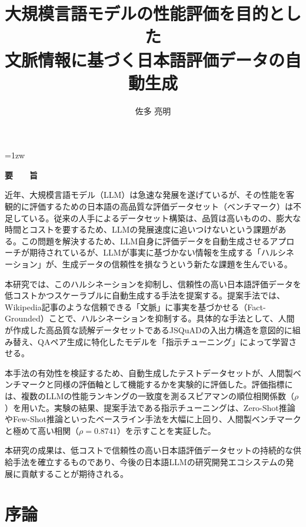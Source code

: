 \documentclass[a4paper,11pt]{jreport}
\title{大規模言語モデルの性能評価を目的とした\\
文脈情報に基づく日本語評価データの自動生成}
\author{佐多 亮明}
\begin{document}
\maketitle
\thispagestyle{empty}
\newpage

\thispagestyle{empty}
\vspace*{20pt plus 1fil}
\parindent=1zw
\noindent
\begin{center}
{\Large \bf 要　　旨}
\vspace{2cm}
\end{center}
近年、大規模言語モデル（LLM）は急速な発展を遂げているが、その性能を客観的に評価するための日本語の高品質な評価データセット（ベンチマーク）は不足している。従来の人手によるデータセット構築は、品質は高いものの、膨大な時間とコストを要するため、LLMの発展速度に追いつけないという課題がある。この問題を解決するため、LLM自身に評価データを自動生成させるアプローチが期待されているが、LLMが事実に基づかない情報を生成する「ハルシネーション」が、生成データの信頼性を損なうという新たな課題を生んでいる。

本研究では、このハルシネーションを抑制し、信頼性の高い日本語評価データを低コストかつスケーラブルに自動生成する手法を提案する。提案手法では、Wikipedia記事のような信頼できる「文脈」に事実を基づかせる（Fact-Grounded）ことで、ハルシネーションを抑制する。具体的な手法として、人間が作成した高品質な読解データセットであるJSQuADの入出力構造を意図的に組み替え、QAペア生成に特化したモデルを「指示チューニング」によって学習させる。

本手法の有効性を検証するため、自動生成したテストデータセットが、人間製ベンチマークと同様の評価軸として機能するかを実験的に評価した。評価指標には、複数のLLMの性能ランキングの一致度を測るスピアマンの順位相関係数（$\rho$）を用いた。実験の結果、提案手法である指示チューニングは、Zero-Shot推論やFew-Shot推論といったベースライン手法を大幅に上回り、人間製ベンチマークと極めて高い相関（$\rho = 0.8741$）を示すことを実証した。

本研究の成果は、低コストで信頼性の高い日本語評価データセットの持続的な供給手法を確立するものであり、今後の日本語LLMの研究開発エコシステムの発展に貢献することが期待される。

\par
\vspace{0pt plus 1fil}
\newpage

\tableofcontents
\listoffigures
\listoftables

\pagebreak \setcounter{page}{1}

\chapter{序論}
\end{document}
